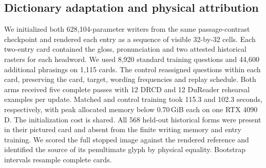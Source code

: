 \subsection*{Dictionary adaptation and physical attribution}
We initialized both 628,104-parameter writers from the same passage-contrast checkpoint and rendered each entry as a sequence of visible 32-by-32 cells. Each two-entry card contained the gloss, pronunciation and two attested historical rasters for each headword. We used 8,920 standard training questions and 44,600 additional phrasings on 1,115 cards. The control reassigned questions within each card, preserving the card, target, wording frequencies and replay schedule. Both arms received five complete passes with 12 DRCD and 12 DuReader rehearsal examples per update. Matched and control training took 115.3 and 102.3 seconds, respectively, with peak allocated memory below 0.70\,GiB each on one RTX 4090 D. The initialization cost is shared. All 568 held-out historical forms were present in their pictured card and absent from the finite writing memory and entry training. We scored the full stopped image against the rendered reference and identified the source of its penultimate glyph by physical equality. Bootstrap intervals resample complete cards.
